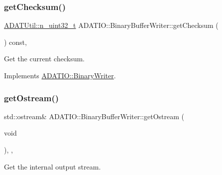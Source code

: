 \mbox{\label{classADATIO_1_1BinaryBufferWriter_a3d7ec1583f03981f0a84571646be46f3}} 
\subsubsection{\texorpdfstring{getChecksum()}{getChecksum()}\hspace{0.1cm}{\footnotesize\ttfamily [3/3]}}
{\footnotesize\ttfamily \mbox{\hyperlink{namespaceADATUtil_ad945a8afa4db2d1f89b731964adae97e}{A\+D\+A\+T\+Util\+::n\+\_\+uint32\+\_\+t}} A\+D\+A\+T\+I\+O\+::\+Binary\+Buffer\+Writer\+::get\+Checksum (\begin{DoxyParamCaption}{ }\end{DoxyParamCaption}) const\hspace{0.3cm}{\ttfamily [inline]}, {\ttfamily [virtual]}}



Get the current checksum. 



Implements \mbox{\hyperlink{classADATIO_1_1BinaryWriter_a8bebb70a7248b14c8a4dcf7aa49c1503}{A\+D\+A\+T\+I\+O\+::\+Binary\+Writer}}.

\mbox{\label{classADATIO_1_1BinaryBufferWriter_a587ce48f0cf6dd4064edde6db836c0a3}} 
\subsubsection{\texorpdfstring{getOstream()}{getOstream()}\hspace{0.1cm}{\footnotesize\ttfamily [1/3]}}
{\footnotesize\ttfamily std\+::ostream\& A\+D\+A\+T\+I\+O\+::\+Binary\+Buffer\+Writer\+::get\+Ostream (\begin{DoxyParamCaption}\item[{void}]{ }\end{DoxyParamCaption})\hspace{0.3cm}{\ttfamily [inline]}, {\ttfamily [protected]}, {\ttfamily [virtual]}}



Get the internal output stream. 



